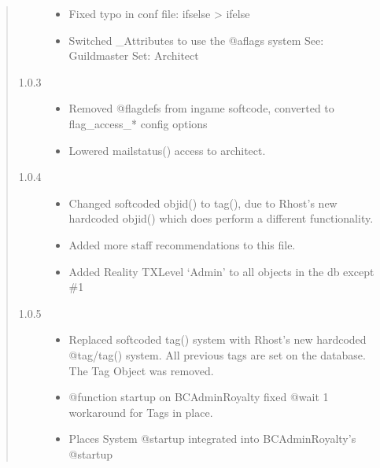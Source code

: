 \documentclass[letterpaper,10pt,english]{sphinxmanual}
\begin{document}
\begin{quote}
\begin{description}
\begin{itemize}
\item {} 
\sphinxAtStartPar
Fixed typo in conf file: ifselse \sphinxhyphen{}\textgreater{} ifelse

\item {} 
\sphinxAtStartPar
Switched \_Attributes to use the @aflags system
See: Guildmaster
Set: Architect

\end{itemize}

\item[{1.0.3}] \leavevmode\begin{itemize}
\item {} 
\sphinxAtStartPar
Removed @flagdefs from in\sphinxhyphen{}game softcode, converted to flag\_access\_*
config options

\item {} 
\sphinxAtStartPar
Lowered mailstatus() access to architect.

\end{itemize}

\item[{1.0.4}] \leavevmode\begin{itemize}
\item {} 
\sphinxAtStartPar
Changed softcoded objid() to tag(), due to Rhost’s new hardcoded
objid() which does perform a different functionality.

\item {} 
\sphinxAtStartPar
Added more staff recommendations to this file.

\item {} 
\sphinxAtStartPar
Added Reality TXLevel ‘Admin’ to all objects in the db except \#1

\end{itemize}

\item[{1.0.5}] \leavevmode\begin{itemize}
\item {} 
\sphinxAtStartPar
Replaced softcoded tag() system with Rhost’s new hardcoded @tag/tag()
system. All previous tags are set on the database. The Tag Object
was removed.

\item {} 
\sphinxAtStartPar
@function startup on BC\sphinxhyphen{}Admin\sphinxhyphen{}Royalty fixed \sphinxhyphen{} @wait 1 workaround for
Tags in place.

\item {} 
\sphinxAtStartPar
Places System @startup integrated into BC\sphinxhyphen{}Admin\sphinxhyphen{}Royalty’s @startup


\end{itemize}
\end{description}
\end{quote}
\end{document}
